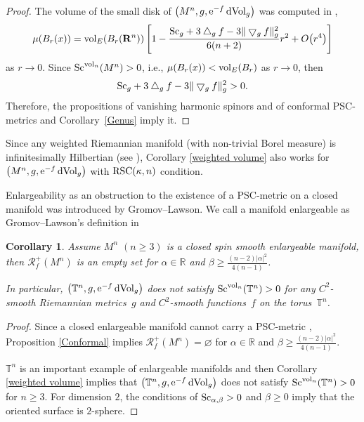 \documentclass[pdftex]{sigma}
\newtheorem{Corollary}[Theorem]{Corollary}
\begin{document}
\begin{proof}The volume of the small disk of $\big(M^n, g, {\rm e}^{-f}\,{\rm dVol}_g\big)$ was computed in \cite[Theorem~8]{MR1458581},
\begin{align*}
\mu(B_r(x)) = {\rm vol}_E(B_r(\mathbf{R}^n))\left[1 - \frac{{\rm Sc}_g +3 \bigtriangleup_gf -3\| \bigtriangledown_gf\|^2_g }{6(n+2)} r^2 + O\big(r^4\big)\right]
 \end{align*}
as $r \rightarrow 0$. Since ${\rm Sc}^{{\rm vol}_n}(M^n) > 0$, i.e., $ \mu(B_r(x)) < {\rm vol}_E(B_r)$ as $r \rightarrow 0$, then
\begin{align*}
 {\rm Sc}_g +3 \bigtriangleup_gf -3\|\bigtriangledown_gf\|^2_g > 0.
\end{align*}
 Therefore, the propositions of vanishing harmonic spinors and of conformal PSC-metrics and Corollary~\ref{Genus} imply it.
\end{proof}

\begin{Remark}
Since any weighted Riemannian manifold (with non-trivial Borel measure) is infinitesimally Hilbertian (see \cite{MR4059811}), Corollary \ref{weighted volume} also works for $\big(M^n, g, {\rm e}^{-f}\,{\rm dVol}_g\big)$ with ${\rm RSC}(\kappa, n)$ condition.
\end{Remark}

Enlargeability as an obstruction to the existence of a PSC-metric on a closed manifold was introduced by Gromov--Lawson. We call a manifold enlargeable as Gromov--Lawson's definition in \cite[Definition~5.5]{MR720933}

\begin{Corollary}
Assume $M^n$ $(n\geq 3)$ is a closed spin smooth enlargeable manifold, then $\mathcal{R}^+_f(M^n)$ is an empty set for $\alpha \in \mathbb{R}$ and $\beta \geq \frac{(n-2)|\alpha|^2}{4(n-1)}$.

 In particular, $\big(\mathbb{T}^n,g, {\rm e}^{-f}\,{\rm dVol}_g\big)$ does not satisfy ${\rm Sc}^{{\rm vol}_n}(\mathbb{T}^n) >0$ for any $C^2$-smooth Riemannian metrics~$g$ and $C^2$-smooth functions~$f$ on the torus~$\mathbb{T}^n$.
\end{Corollary}

\begin{proof}Since a closed enlargeable manifold cannot carry a PSC-metric \cite[Theorem~5.8]{MR720933}, Proposition \ref{Conformal} implies $\mathcal{R}^+_f(M^n)=\varnothing$ for $\alpha \in \mathbb{R}$ and $\beta \geq \frac{(n-2)|\alpha|^2}{4(n-1)}$.

 $\mathbb{T}^n$ is an important example of enlargeable manifolds and then Corollary \ref{weighted volume} implies that $\big(\mathbb{T}^n,g, {\rm e}^{-f}\,{\rm dVol}_g\big)$ does not satisfy ${\rm Sc}^{{\rm vol}_n}(\mathbb{T}^n) >0$ for $n\geq 3$. For dimension $2$, the conditions of ${\rm Sc}_{\alpha, \beta} > 0$ and $\beta\geq 0$ imply that the oriented surface is $2$-sphere.
\end{proof}
\end{document}
